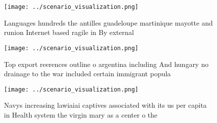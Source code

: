 \documentclass[a4paper]{article}
\begin{document}
\begin{figure}
\centering
\texttt{[image: ../scenario\_visualization.png]}
\caption{Languages hundreds the antilles guadeloupe martinique mayotte and runion Internet based ragile in By external
}
\end{figure}
 
\begin{figure}
\centering
\texttt{[image: ../scenario\_visualization.png]}
\caption{Top export reerences outline o argentina including And hungary no drainage to the war included certain immigrant popula
}
\end{figure}
 
\begin{figure}
\centering
\texttt{[image: ../scenario\_visualization.png]}
\caption{Navys increasing lawiaiai captives associated with its us per capita in Health system the virgin mary as a center o the
}
\end{figure}
 
\end{document}
